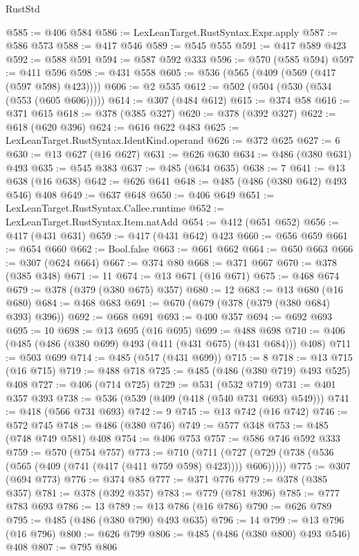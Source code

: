 \begin{lexlean}{RustStd}
\begin{coremodule}
@585 := @406 @584
@586 := LexLeanTarget.RustSyntax.Expr.apply
@587 := @586 @573
@588 := @417 @546
@589 := @545 @555
@591 := @417 @589 @423
@592 := @588 @591
@594 := @587 @592 @333
@596 := @570 (@585 @594)
@597 := @411 @596
@598 := @431 @558
@605 := @536 (@565 (@409 (@569 (@417 (@597 @598) @423))))
@606 := @2 @535
@612 := @502 (@504 (@530 (@534 (@553 (@605 @606)))))
@614 := @307 (@484 @612)
@615 := @374 @58
@616 := @371 @615
@618 := @378 (@385 @327)
@620 := @378 (@392 @327)
@622 := @618 (@620 @396)
@624 := @616 @622 @483
@625 := LexLeanTarget.RustSyntax.IdentKind.operand
@626 := @372 @625
@627 := 6
@630 := @13 @627 (@16 @627)
@631 := @626 @630
@634 := @486 (@380 @631) @493
@635 := @545 @383
@637 := @485 (@634 @635)
@638 := 7
@641 := @13 @638 (@16 @638)
@642 := @626 @641
@648 := @485 (@486 (@380 @642) @493 @546) @408
@649 := @637 @648
@650 := @406 @649
@651 := LexLeanTarget.RustSyntax.Callee.runtime
@652 := LexLeanTarget.RustSyntax.Item.natAdd
@654 := @412 (@651 @652)
@656 := @417 (@431 @631)
@659 := @417 (@431 @642) @423
@660 := @656 @659
@661 := @654 @660
@662 := Bool.false
@663 := @661 @662
@664 := @650 @663
@666 := @307 (@624 @664)
@667 := @374 @80
@668 := @371 @667
@670 := @378 (@385 @348)
@671 := 11
@674 := @13 @671 (@16 @671)
@675 := @468 @674
@679 := @378 (@379 (@380 @675) @357)
@680 := 12
@683 := @13 @680 (@16 @680)
@684 := @468 @683
@691 := @670 (@679 (@378 (@379 (@380 @684) @393) @396))
@692 := @668 @691
@693 := @400 @357
@694 := @692 @693
@695 := 10
@698 := @13 @695 (@16 @695)
@699 := @488 @698
@710 := @406 (@485 (@486 (@380 @699) @493 (@411 (@431 @675) (@431 @684))) @408)
@711 := @503 @699
@714 := @485 (@517 (@431 @699))
@715 := 8
@718 := @13 @715 (@16 @715)
@719 := @488 @718
@725 := @485 (@486 (@380 @719) @493 @525) @408
@727 := @406 (@714 @725)
@729 := @531 (@532 @719)
@731 := @401 @357 @393
@738 := @536 (@539 (@409 (@418 (@540 @731 @693) @549)))
@741 := @418 (@566 @731 @693)
@742 := 9
@745 := @13 @742 (@16 @742)
@746 := @572 @745
@748 := @486 (@380 @746)
@749 := @577 @348
@753 := @485 (@748 @749 @581) @408
@754 := @406 @753
@757 := @586 @746 @592 @333
@759 := @570 (@754 @757)
@773 := @710
    (@711 (@727 (@729 (@738 (@536 (@565 (@409 (@741 (@417 (@411 @759 @598) @423)))) @606)))))
@775 := @307 (@694 @773)
@776 := @374 @85
@777 := @371 @776
@779 := @378 (@385 @357)
@781 := @378 (@392 @357)
@783 := @779 (@781 @396)
@785 := @777 @783 @693
@786 := 13
@789 := @13 @786 (@16 @786)
@790 := @626 @789
@795 := @485 (@486 (@380 @790) @493 @635)
@796 := 14
@799 := @13 @796 (@16 @796)
@800 := @626 @799
@806 := @485 (@486 (@380 @800) @493 @546) @408
@807 := @795 @806

\end{coremodule}
\end{lexlean}
